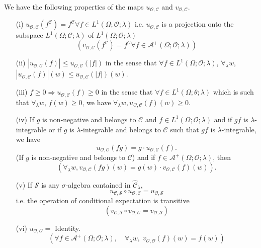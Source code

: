We have the following properties of the maps $u_{\mathscr{O},
  \mathscr{C}}$ and $v_{\mathscr{O}, \mathscr{C}}$. 
\begin{itemize}
\item[{\rm (i)}] $u_{\mathscr{O}, \mathscr{C}} (f^\mathscr{C}) =
  f^\mathscr{C} \forall  f \in L^1 (\Omega; \mathscr{O}; \lambda)$
  i.e. $u_{\mathscr{O}, \mathscr{C}}$ is a projection onto the
  subspace $L^1(\Omega; \mathscr{C}; \lambda)$ of $L^1 (\Omega;
  \mathscr{O}; \lambda)$
$$
(v_{\mathscr{O}, \mathscr{C}} (f^\mathscr{C}) = f^\mathscr{C} \forall
  f \in \mathscr{A}^+ (\Omega; \mathscr{O}; \lambda))
$$

\item[{\rm (ii)}] $|u_{\mathscr{O}, \mathscr{C}} (f)| \leq
  u_{\mathscr{O}, \mathscr{C}} (|f|)$ in the sense that $\forall f \in
  L^1 (\Omega; \mathscr{O}; \lambda)$, $\forall_\lambda w$,
  $|u_{\mathscr{O}, \mathscr{C}} (f)| (w) \leq u_{\mathscr{O},
    \mathscr{C}} (|f|)(w)$. 


\item[{\rm (iii)}] $f \geq 0 \Rightarrow u_{\mathscr{O}, \mathscr{C}} (f) \geq 0$
  in the sense that $ \forall f \in L^1 (\Omega; \theta; \lambda)$ which is such that $\forall_\lambda w$, $f(w) \geq 0$, we have  $\forall_\lambda w, u_{\mathscr{O}, \mathscr{C}} (f) (w) \geq 0$. 

\item[{\rm (iv)}] If $g$ is non-negative and belongs to $\mathscr{C}$ and $f \in
  L^1(\Omega; \mathscr{O}; \lambda)$ and if $gf$ is
  $\lambda$-integrable or if $g$ is $\lambda$-integrable and belongs
  to $\mathscr{C}$  such that $gf$ is $\lambda$-integrable, we have 
$$
u_{\mathscr{O}, \mathscr{C}} (fg) = g \cdot u_{\mathscr{O},
  \mathscr{C}} (f). 
$$\pageoriginale 
(If $g$ is non-negative and belongs to $\mathscr{C}$) and if $f \in
\mathscr{A}^+ (\Omega; \mathscr{O}; \lambda)$, then
$$
(\forall_\lambda w, v_{\mathscr{O}, \mathscr{C}} (fg )(w) = g(w) \cdot
v_{\mathscr{O}, \mathscr{C}} (f) (w)).
$$

\item[{\rm (v)}] If $\mathscr{S}$ is any $\sigma$-algebra contained in
  $\hat{\mathscr{C}}_\lambda$, 
$$
u_{\mathscr{C}, \mathscr{S}} \circ u_{\mathscr{O}, \mathscr{C}} =
u_{\mathscr{O}, \mathscr{S}}
$$ 
i.e. the operation of conditional expectation is transitive
$$
(v_{\mathscr{C}, \mathscr{S}} \circ v_{\mathscr{O}, \mathscr{C}} =
v_{\mathscr{O}, \mathscr{S}})
$$

\item[{\rm (vi)}] \qquad $u_{\mathscr{O}, \mathscr{O}} =$ Identity. 
$$
(\forall f \in \mathscr{A}^+ (\Omega; \mathscr{O}; \lambda), \quad
  \forall_\lambda w, \; v_{\mathscr{O}, \mathscr{O}} (f) (w) = f(w))
$$


\end{itemize}
